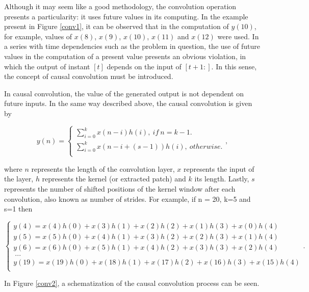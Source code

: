 Although it may seem like a good methodology, the convolution operation presents a particularity: it uses future values in its computing. In the example present in Figure \ref{conv1}, it can be observed that in the computation of $y(10)$, for example, values of $x(8)$, $x(9)$, $x(10)$, $x(11)$ and $x(12)$ were used. In a series with time dependencies such as the problem in question, the use of future values in the computation of a present value presents an obvious violation, in which the output of instant $[t]$ depends on the input of $[t+1:]$. In this sense, the concept of causal convolution must be introduced. 

In causal convolution, the value of the generated output is not dependent on future inputs. In the same way described above, the causal convolution is given by 

\begin{equation}
y(n)=
    \begin{cases} 
            
        \sum_{i=0}^k x(n-i)h(i),\  if \  n=k-1.\\
        \sum_{i=0}^k x(n-i+(s-1))h(i),\  otherwise.\\
    
    \end{cases} ,
\end{equation}

where $n$ represents the length of the convolution layer, $x$ represents the input of the layer, $h$ represents the kernel (or extracted patch) and $k$ its length. Lastly, $s$ represents the number of shifted positions of the kernel window after each convolution, also known as number of strides. For example, if n = 20, k=5 and s=1 then

\begin{equation}
    \begin{cases} 
        y(4)=x(4)h(0)+x(3)h(1)+x(2)h(2)+x(1)h(3)+x(0)h(4)\\
        y(5)=x(5)h(0)+x(4)h(1)+x(3)h(2)+x(2)h(3)+x(1)h(4)\\
        y(6)=x(6)h(0)+x(5)h(1)+x(4)h(2)+x(3)h(3)+x(2)h(4)\\
        \  ...\\
        y(19)=x(19)h(0)+x(18)h(1)+x(17)h(2)+x(16)h(3)+x(15)h(4)\\
    \end{cases} .
    \label{noncausal}
\end{equation}

In Figure \ref{conv2}, a schematization of the causal convolution process can be seen.

